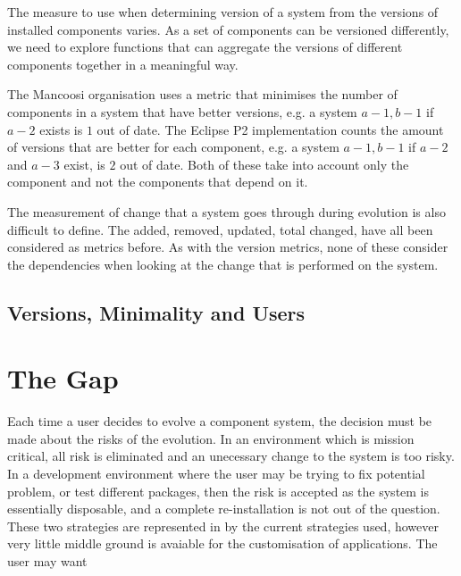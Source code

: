 The measure to use when determining version of a system from the versions of installed components varies.
As a set of components can be versioned differently, 
we need to explore functions that can aggregate the versions of different components together in a meaningful way.




The Mancoosi organisation uses a metric that minimises the number of components in a system that have better versions, 
e.g. a system $a-1,b-1$ if $a-2$ exists is $1$ out of date. 
The Eclipse P2 implementation counts the amount of versions that are better for each component,
e.g. a system $a-1,b-1$ if $a-2$ and $a-3$ exist, is $2$ out of date.
Both of these take into account only the component and not the components that depend on it.

The measurement of change that a system goes through during evolution is also difficult to define.
The added, removed, updated, total changed, have all been considered as metrics before. 
As with the version metrics, none of these consider the dependencies when looking at the change that is performed on the system.

\subsection{Versions, Minimality and Users}

\section{The Gap}
Each time a user decides to evolve a component system, the decision must be made about the risks of the evolution.
In an environment which is mission critical, all risk is eliminated and an unecessary change to the system is too risky.
In a development environment where the user may be trying to fix potential problem, 
or test different packages, then the risk is accepted as the system is essentially disposable, and a complete re-installation is not out of the question.
These two strategies are represented in by the current strategies used, however very little middle ground is avaiable for the customisation of applications.
The user may want 